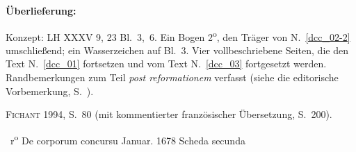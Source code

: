 %
%
%
%
%
\frenchspacing%
%
\begin{ledgroupsized}[r]{120mm}%
\footnotesize%
\pstart%
\noindent\textbf{Überlieferung:}%
\pend%
\end{ledgroupsized}%
\begin{ledgroupsized}[r]{114mm}%
\footnotesize%
\pstart%
\parindent -6mm
%
Konzept: LH XXXV 9, 23 Bl.~3,~6.
Ein Bogen 2\textsuperscript{o},
den Träger von N.~\ref{dcc_02-2} %
umschließend;
ein Wasserzeichen auf Bl.~3.
Vier vollbeschriebene Seiten, die den Text N.~\ref{dcc_01} %
fortsetzen und vom Text N.~\ref{dcc_03} %
fortgesetzt werden.
Randbemerkungen zum Teil \textit{post reformationem} verfasst (siehe die editorische Vorbemerkung, S.~).
\pend%
\end{ledgroupsized}%
%
\begin{ledgroupsized}[r]{114mm}%
\footnotesize%
\pstart%
\parindent -6mm%
%
\textsc{Fichant}\cite{01056} 1994, S.~80
(mit kommentierter französischer Übersetzung, S.~200).

\pend%
\end{ledgroupsized}%
%
%
\frenchspacing%
%
\count{}%
\count{}%
\count{}%
%
\vspace{8mm}%
\normalsize%
\pstart%
\noindent%
%
~r\textsuperscript{o}\rbrack%
%
\phantom{Januar. 1678}%
\hfill%
De corporum concursu%
\protect{}
\hfill%
%
Januar. 1678
\pend%
%
\pstart%
\noindent%
\centering%
Scheda secunda\protect{}
\pend%
\vspace{0.5em}%
